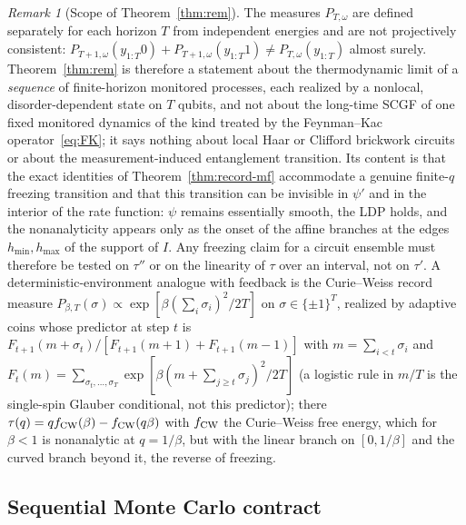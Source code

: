 \documentclass[aps,prx,reprint,superscriptaddress,nobibnotes,longbibliography]{revtex4-2}
\theoremstyle{remark}
\newtheorem{remark}{Remark}
\begin{document}
\begin{remark}[Scope of Theorem~\ref{thm:rem}]
\label{rem:rem-scope}
The measures $P_{T,\omega}$ are defined separately for each horizon $T$ from independent energies and are not projectively consistent: $P_{T+1,\omega}(y_{1:T}0)+P_{T+1,\omega}(y_{1:T}1)\ne P_{T,\omega}(y_{1:T})$ almost surely.  Theorem~\ref{thm:rem} is therefore a statement about the thermodynamic limit of a \emph{sequence} of finite-horizon monitored processes, each realized by a nonlocal, disorder-dependent state on $T$ qubits, and not about the long-time SCGF of one fixed monitored dynamics of the kind treated by the Feynman--Kac operator~\eqref{eq:FK}; it says nothing about local Haar or Clifford brickwork circuits or about the measurement-induced entanglement transition.  Its content is that the exact identities of Theorem~\ref{thm:record-mf} accommodate a genuine finite-$q$ freezing transition and that this transition can be invisible in $\psi'$ and in the interior of the rate function: $\psi$ remains essentially smooth, the LDP holds, and the nonanalyticity appears only as the onset of the affine branches at the edges $h_{\min},h_{\max}$ of the support of $I$.  Any freezing claim for a circuit ensemble must therefore be tested on $\tau''$ or on the linearity of $\tau$ over an interval, not on $\tau'$.  A deterministic-environment analogue with feedback is the Curie--Weiss record measure $P_{\beta,T}(\sigma)\propto\exp[\beta(\sum_i\sigma_i)^2/2T]$ on $\sigma\in\{\pm1\}^T$, realized by adaptive coins whose predictor at step $t$ is $F_{t+1}(m+\sigma_t)/[F_{t+1}(m+1)+F_{t+1}(m-1)]$ with $m=\sum_{i<t}\sigma_i$ and $F_t(m)=\sum_{\sigma_t,\ldots,\sigma_T}\exp[\beta(m+\sum_{j\ge t}\sigma_j)^2/2T]$ (a logistic rule in $m/T$ is the single-spin Glauber conditional, not this predictor); there $\tau(q)=qf_{\rm CW}(\beta)-f_{\rm CW}(q\beta)$ with $f_{\rm CW}$ the Curie--Weiss free energy, which for $\beta<1$ is nonanalytic at $q=1/\beta$, but with the linear branch on $[0,1/\beta]$ and the curved branch beyond it, the reverse of freezing.
\end{remark}


\subsection{Sequential Monte Carlo contract}
\end{document}
